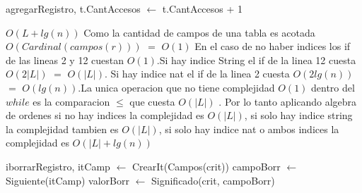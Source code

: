 \begin{Algoritmos}
\begin{algoritmo}{agregarRegistro}{, }{}
    t.CantAccesos $\leftarrow$ t.CantAccesos + 1 
    
  \end{algoritmo}
  \datosAlgoritmo{} %
  {} %
  {} %
  {$O(L+lg(n))$} %
 {Como la cantidad de campos de una tabla es acotada $O(Cardinal(campos(r)))$ $=$ $O(1)$  En el caso de no haber indices los if de las lineas 2 y 12 cuestan $O(1)$.Si hay indice String el if de la linea 12 cuesta $O(2|L|)$ $=$ $O(|L|)$. Si hay indice nat el if de la linea 2 cuesta $O(2lg(n))$ $=$ $O(lg(n))$.La unica operacion que no tiene complejidad $O(1)$ dentro del $while$  es la comparacion $\leq$ que cuesta $O(|L|)$ . Por lo tanto aplicando algebra de ordenes si no hay indices la complejidad es $O(|L|)$, si solo hay indice string la complejidad tambien es $O(|L|)$, si solo hay indice nat o ambos indices la complejidad es $O(|L| + lg(n))$} %
  


  \begin{algoritmo}{iborrarRegistro}{, }{}
    itCamp $\leftarrow$ CrearIt(Campos(crit)) 
    campoBorr $\leftarrow$ Siguiente(itCamp) 
    valorBorr $\leftarrow$ Significado(crit, campoBorr)  %


\end{algoritmo}
\end{Algoritmos}
